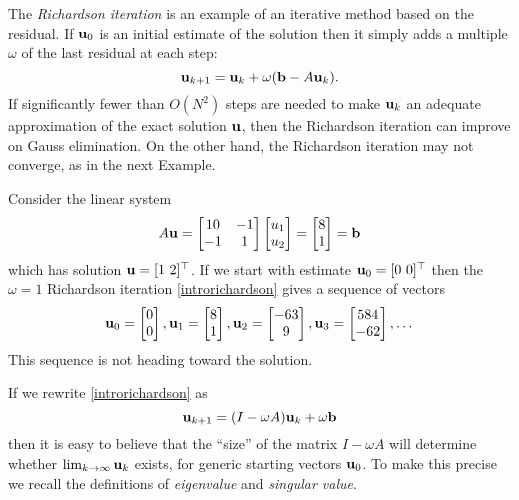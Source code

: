 The \emph{Richardson iteration} is an example of an iterative method based on the residual.  If $\mathbf{u}_0$ is an initial estimate of the solution then it simply adds a multiple $\omega$ of the last residual at each step:
\begin{equation}
\mathbf{u}_{k+1} = \mathbf{u}_k + \omega (\mathbf{b} - A \mathbf{u}_k).  \label{introrichardson}
\end{equation}
If significantly fewer than $O(N^2)$ steps are needed to make $\mathbf{u}_k$ an adequate approximation of the exact solution $\mathbf{u}$, then the Richardson iteration can improve on Gauss elimination.  On the other hand, the Richardson iteration may not converge, as in the next Example.

\newcommand{\rvect}[3]{\ensuremath{\bu_{#1} = \begin{bmatrix} #2 \\ #3 \end{bmatrix}}}

\medskip\noindent\hrulefill
\begin{example} Consider the linear system
\begin{equation}
A \mathbf{u}
= \begin{bmatrix}
10 & -1 \\ -1 & 1
\end{bmatrix}
\begin{bmatrix} u_1 \\ u_2 \end{bmatrix}
= \begin{bmatrix} 8 \\ 1 \end{bmatrix}
= \mathbf{b}
 \label{introexample}
\end{equation}
which has solution $\mathbf{u} = [1\,\, 2]^\top$.  If we start with estimate $\mathbf{u}_0 = [0\,\, 0]^\top$ then the $\omega=1$ Richardson iteration \eqref{introrichardson} gives a sequence of vectors %
\begin{equation}
\rvect{0}{0}{0}, \rvect{1}{8}{1}, \rvect{2}{-63}{9}, \rvect{3}{584}{-62}, \dots
\end{equation}
This sequence is not heading toward the solution.
\end{example}
\noindent\hrulefill

\medskip
If we rewrite \eqref{introrichardson} as
\begin{equation}
\mathbf{u}_{k+1} = (I - \omega A) \mathbf{u}_k + \omega \mathbf{b}  \label{introrewriterichardson}
\end{equation}
then it is easy to believe that the ``size'' of the matrix $I-\omega A$ will determine whether $\lim_{k\to\infty} \mathbf{u}_k$ exists, for generic starting vectors $\mathbf{u}_0$.  To make this precise we recall the definitions of \emph{eigenvalue} and \emph{singular value}.


